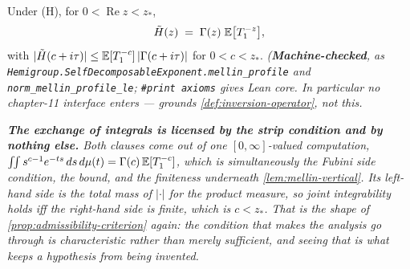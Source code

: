 \begin{lemma}\label{lem:mellin-data}
\leanok
Under (H), for $0 < \operatorname{Re} z < z_*$,
\[
  \tilde H(z) \;=\; \Gamma(z)\;\mathbb{E}\bigl[T_1^{-z}\bigr],
\]
with $|\tilde H(c + i\tau)| \le \mathbb{E}[T_1^{-c}]\,|\Gamma(c+i\tau)|$ for $0 < c < z_*$.
\statusT\quad\emph{(\textbf{Machine-checked}, as
\texttt{Hemigroup.SelfDecomposableExponent.mellin\_profile} and
\texttt{norm\_mellin\_profile\_le}; \texttt{\#print axioms} gives Lean core. In particular \emph{no} chapter-11
interface enters ---  grounds \ref{def:inversion-operator}, not this.}

\emph{\textbf{The exchange of integrals is licensed by the strip condition and by nothing else.}
Both clauses come out of one $[0,\infty]$-valued computation,
$\int\!\!\int s^{c-1}e^{-ts}\,ds\,d\mu(t) = \Gamma(c)\,\mathbb{E}[T_1^{-c}]$, which is simultaneously the
Fubini side condition, the bound, and the finiteness underneath \ref{lem:mellin-vertical}. Its
left-hand side is the total mass of $|{\cdot}|$ for the product measure, so joint integrability
holds \emph{iff} the right-hand side is finite, which is $c < z_*$. That is the shape of
\ref{prop:admissibility-criterion} again: the condition that makes the analysis go through is
characteristic rather than merely sufficient, and seeing that is what keeps a hypothesis from
being invented.}


\end{lemma}
